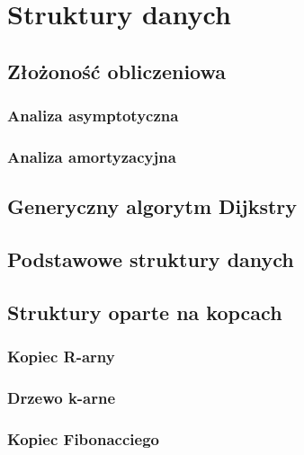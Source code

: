 \chapter{Struktury danych}


\section{Złożoność obliczeniowa}


\subsection{Analiza asymptotyczna}


\subsection{Analiza amortyzacyjna}


\section{Generyczny algorytm Dijkstry}


\section{Podstawowe struktury danych}


\section{Struktury oparte na kopcach}


\subsection{Kopiec R-arny}


\subsection{Drzewo k-arne}


\subsection{Kopiec Fibonacciego}

